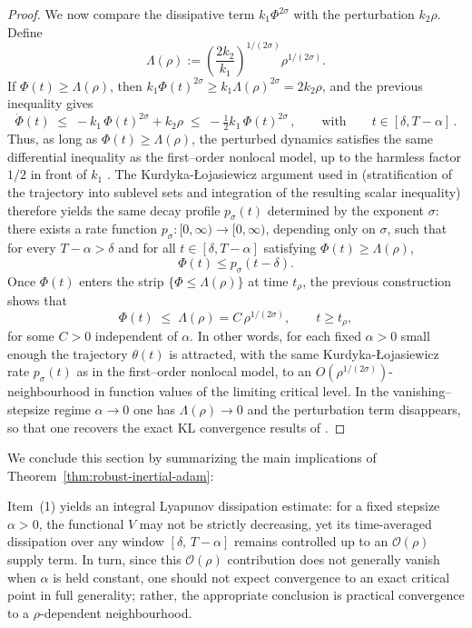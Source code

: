 \documentclass{article} %
\begin{document}
\begin{proof}
We now compare the dissipative term $k_1\Phi^{2\sigma}$ with the perturbation $k_2\rho$. Define
\[
\Lambda(\rho)
:= \left(\frac{2k_2}{k_1}\right)^{1/(2\sigma)}\rho^{1/(2\sigma)}.
\]
If $\Phi(t)\ge \Lambda(\rho)$, then $k_1\Phi(t)^{2\sigma}\ge k_1\Lambda(\rho)^{2\sigma}=2k_2\rho$, and the previous inequality gives
\[
\dot\Phi(t)
\;\le\;
-k_1\,\Phi(t)^{2\sigma} + k_2\rho
\;\le\;
-\tfrac12 k_1\,\Phi(t)^{2\sigma}\,, \qquad \text{with} \qquad t\in[\delta,T-\alpha]\,.
\]
Thus, as long as $\Phi(t)\ge\Lambda(\rho)$, the perturbed dynamics satisfies the same differential inequality as the first–order nonlocal model, up to the harmless factor $1/2$ in front of $k_1$ \cite{heredia2025modelingadagradrmspropadam}. The Kurdyka-Łojasiewicz argument used in \cite{heredia2025modelingadagradrmspropadam} (stratification of the trajectory into sublevel sets and integration of the resulting scalar inequality) therefore yields the same decay profile $p_\sigma(t)$ determined by the exponent $\sigma$: there exists a rate function $p_\sigma:[0,\infty)\to[0,\infty)$, depending only on $\sigma$, such that for every $T-\alpha>\delta$ and for all $t\in[\delta,T-\alpha]$ satisfying $\Phi(t)\ge\Lambda(\rho)$,
\[
\Phi(t)\le p_\sigma(t-\delta).
\]
Once $\Phi(t)$ enters the strip $\{\Phi\le\Lambda(\rho)\}$ at time $t_\rho$, the previous construction shows that
\[
\Phi(t)\;\le\;\Lambda(\rho)
= C\,\rho^{1/(2\sigma)}, \qquad t\ge t_\rho,
\]
for some $C>0$ independent of $\alpha$. In other words, for each fixed $\alpha>0$ small enough the trajectory $\theta(t)$ is attracted, with the same Kurdyka-Łojasiewicz rate $p_\sigma(t)$ as in the first–order nonlocal model, to an $O(\rho^{1/(2\sigma)})$-neighbourhood in function values of the limiting critical level. In the vanishing–stepsize regime $\alpha\to 0$ one has $\Lambda(\rho)\to 0$ and the perturbation term disappears, so that one recovers the exact KL convergence results of \cite{heredia2025modelingadagradrmspropadam}.
\end{proof}

We conclude this section by summarizing the main implications of Theorem~\ref{thm:robust-inertial-adam}:

Item~(1) yields an integral Lyapunov dissipation estimate: for a fixed stepsize $\alpha>0$, the functional $V$ may not be strictly decreasing, yet its time-averaged dissipation over any window $[\delta,\,T-\alpha]$ remains controlled up to an $\mathcal{O}(\rho)$ supply term. In turn, since this $\mathcal{O}(\rho)$ contribution does not generally vanish when $\alpha$ is held constant, one should not expect convergence to an exact critical point in full generality; rather, the appropriate conclusion is practical convergence to a $\rho$-dependent neighbourhood.
\end{document}

